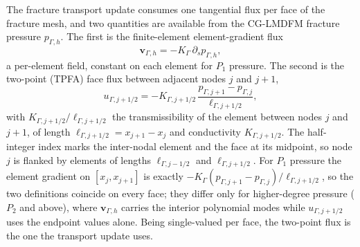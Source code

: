 \documentclass[a4paper,fleqn]{cas-sc}
\newcommand{\vflux}{\mathbf{v}}
\begin{document}
The fracture transport update consumes one tangential flux per face of the fracture
mesh, and two quantities are available from the CG-LMDFM fracture pressure
\(p_{\Gamma,h}\). The first is the finite-element element-gradient flux
\[
  \vflux_{\Gamma,h}=-K_\Gamma\,\partial_s p_{\Gamma,h},
\]
a per-element field, constant on each element for $P_1$ pressure. The
second is the two-point (TPFA) face flux between adjacent nodes \(j\) and \(j+1\),
\[
  u_{\Gamma,j+1/2}=-K_{\Gamma,j+1/2}\,
  \frac{p_{\Gamma,j+1}-p_{\Gamma,j}}{\ell_{\Gamma,j+1/2}},
\]
with \(K_{\Gamma,j+1/2}/\ell_{\Gamma,j+1/2}\) the transmissibility of the element
between nodes \(j\) and \(j+1\), of length \(\ell_{\Gamma,j+1/2}=x_{j+1}-x_j\) and
conductivity \(K_{\Gamma,j+1/2}\). The half-integer index marks the inter-nodal
element and the face at its midpoint, so node \(j\) is flanked by elements of lengths
\(\ell_{\Gamma,j-1/2}\) and \(\ell_{\Gamma,j+1/2}\). For $P_1$ pressure the
element gradient
on \([x_j,x_{j+1}]\) is exactly
\(-K_\Gamma(p_{\Gamma,j+1}-p_{\Gamma,j})/\ell_{\Gamma,j+1/2}\), so the two definitions
coincide on every face; they differ only for higher-degree pressure
(\(P_2\) and above), where \(\vflux_{\Gamma,h}\) carries the interior polynomial
modes while \(u_{\Gamma,j+1/2}\) uses the endpoint values alone. Being single-valued per face, the two-point flux is the one the
transport update uses.

\begin{center}
\centering
{}
\label{fig:fracture_stencil}
\end{center}
\end{document}
